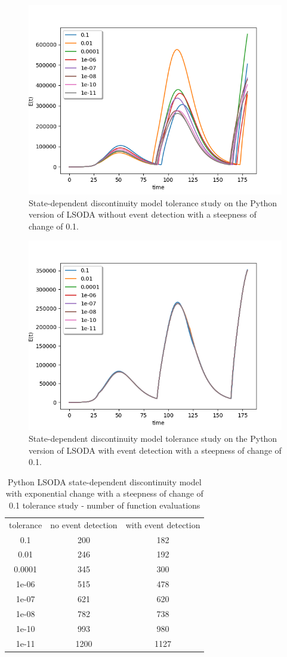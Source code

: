 \begin{figure}[H]
\centering
\includegraphics[width=0.7\linewidth]{./figures/exp_state_tol_lsoda_no_event_0_1}
\caption{State-dependent discontinuity model tolerance study on the Python version of LSODA without event detection with a steepness of change of 0.1.}
\label{fig:exp_state_tol_lsoda_no_event_0_1}
\end{figure}

\begin{figure}[H]
\centering
\includegraphics[width=0.7\linewidth]{./figures/exp_state_tol_lsoda_event_0_1}
\caption{State-dependent discontinuity model tolerance study on the Python version of LSODA with event detection with a steepness of change of 0.1.}
\label{fig:exp_state_tol_lsoda_event_0_1}
\end{figure}

\begin{table}[H]
\caption {Python LSODA state-dependent discontinuity model with exponential change with a steepness of change of 0.1 tolerance study - number of function evaluations} \label{tab:exp_state_tol_lsoda_0_1} 
\begin{center}
\begin{tabular}{ c c c }
tolerance & no event detection & with event detection \\ 
0.1 & 200 & 182 \\
0.01 & 246 & 192 \\
0.0001 & 345 & 300 \\
1e-06 & 515 & 478 \\
1e-07 & 621 & 620 \\
1e-08 & 782 & 738 \\
1e-10 & 993 & 980 \\
1e-11 & 1200 & 1127 \\
\end{tabular}
\end{center}
\end{table}

